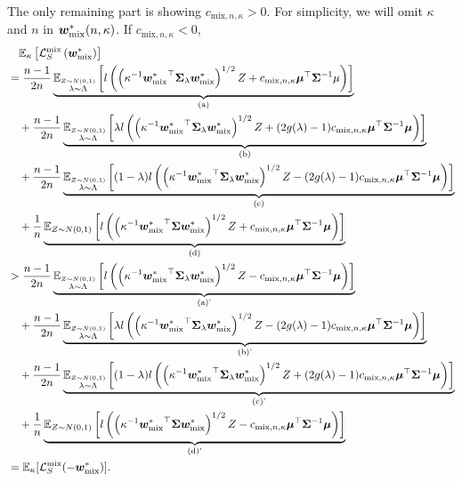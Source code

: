  The only remaining part is showing $c_{\mathrm{mix},n,\kappa}>0$. For simplicity, we will omit $\kappa$ and $n$ in ${\bm{w}}^*_\mathrm{mix}(n,\kappa)$. If $c_{\mathrm{mix}, n, \kappa}<0$, 
\begin{align*}
    &\quad \mathbb{E}_\kappa \left[\mathcal{L}_S^\mathrm{mix}\left({\bm{w}}_{\mathrm{mix}}^*\right)\right]\\
    &= \frac{n-1}{2n} \underbrace{\mathbb{E}_{\overset{Z \sim N(0,1)}{\lambda \sim \Lambda} } \left[l\left( \left (\kappa^{-1} {{\bm{w}}_{\mathrm{mix}}^*}^\top {\bm{\Sigma}}_\lambda {\bm{w}}_{\mathrm{mix}}^* \right)^{1/2}  Z + c_{\mathrm{mix},n,\kappa} {\bm{\mu}}^\top {\bm{\Sigma}}^{-1} \mu \right)\right] }_\text{(a)}\\
    &\quad+ \frac{n-1}{2n} \underbrace{\mathbb{E}_{\overset{Z \sim N(0,1)}{\lambda \sim \Lambda} }\left[\lambda l\left( \left(\kappa^{-1} {{\bm{w}}_{\mathrm{mix}}^*}^\top {\bm{\Sigma}}_\lambda {\bm{w}}_{\mathrm{mix}}^*\right)^{1/2} Z + (2g(\lambda)-1) c_{\mathrm{mix},n,\kappa} {\bm{\mu}}^\top {\bm{\Sigma}}^{-1} {\bm{\mu}}\right)\right]}_\text{(b)} \\
    &\quad+ \frac{n-1}{2n} \underbrace{\mathbb{E}_{\overset{Z \sim N(0,1)}{\lambda \sim \Lambda} }\left[(1-\lambda) l\left( \left(\kappa^{-1} {{\bm{w}}_{\mathrm{mix}}^*}^\top {\bm{\Sigma}}_\lambda {\bm{w}}_{\mathrm{mix}}^*\right)^{1/2} Z -(2g(\lambda)-1) c_{\mathrm{mix}, n, \kappa} {\bm{\mu}}^\top {\bm{\Sigma}}^{-1} {\bm{\mu}}\right)\right]}_\text{(c)} \\
    &\quad+ \frac{1}{n} \underbrace{\mathbb{E}_{Z \sim N(0,1) }\left[ l\left( \left(\kappa^{-1} {{\bm{w}}_{\mathrm{mix}}^*}^\top {\bm{\Sigma}} {\bm{w}}_{\mathrm{mix}}^*\right)^{1/2} Z + c_{\mathrm{mix}, n, \kappa} {\bm{\mu}}^\top {\bm{\Sigma}}^{-1} {\bm{\mu}} \right) \right]}_\text{(d)}\\
    &> \frac{n-1}{2n} \underbrace{\mathbb{E}_{\overset{Z \sim N(0,1)}{\lambda \sim \Lambda} } \left[l\left( \left (\kappa^{-1} {{\bm{w}}_{\mathrm{mix}}^*}^\top {\bm{\Sigma}}_\lambda {\bm{w}}_{\mathrm{mix}}^* \right)^{1/2}  Z - c_{\mathrm{mix},n,\kappa} {\bm{\mu}}^\top {\bm{\Sigma}}^{-1} {\bm{\mu}} \right)\right]}_\text{(a)'} \\
    &\quad+ \frac{n-1}{2n} \underbrace{\mathbb{E}_{\overset{Z \sim N(0,1)}{\lambda \sim \Lambda} }\left[\lambda l\left( \left(\kappa^{-1} {{\bm{w}}_{\mathrm{mix}}^*}^\top {\bm{\Sigma}}_\lambda {\bm{w}}_{\mathrm{mix}}^*\right)^{1/2} Z - (2g(\lambda)-1) c_{\mathrm{mix},n,\kappa} {\bm{\mu}}^\top {\bm{\Sigma}}^{-1} {\bm{\mu}}\right)\right]}_\text{(b)'} \\
    &\quad+ \frac{n-1}{2n} \underbrace{\mathbb{E}_{\overset{Z \sim N(0,1)}{\lambda \sim \Lambda} }\left[(1-\lambda) l\left(\left(\kappa^{-1} {{\bm{w}}_{\mathrm{mix}}^*}^\top {\bm{\Sigma}}_\lambda {\bm{w}}_{\mathrm{mix}}^* \right)^{1/2} Z +(2g(\lambda)-1) c_{\mathrm{mix}, n, \kappa} {\bm{\mu}}^\top {\bm{\Sigma}}^{-1} {\bm{\mu}}\right)\right]}_\text{(c)'} \\
    &\quad+ \frac{1}{n} \underbrace{\mathbb{E}_{Z \sim N(0,1) }\left[ l\left( \left(\kappa^{-1} {{\bm{w}}_{\mathrm{mix}}^*}^\top {\bm{\Sigma}} {\bm{w}}_{\mathrm{mix}}^*\right)^{1/2} Z - c_{\mathrm{mix}, n, \kappa} {\bm{\mu}}^\top {\bm{\Sigma}}^{-1} {\bm{\mu}} \right) \right]}_\text{(d)'}\\
    &= \mathbb{E}_\kappa[\mathcal{L}_S^\mathrm{mix}(-{\bm{w}}_{\mathrm{mix}}^*)].
\end{align*}
